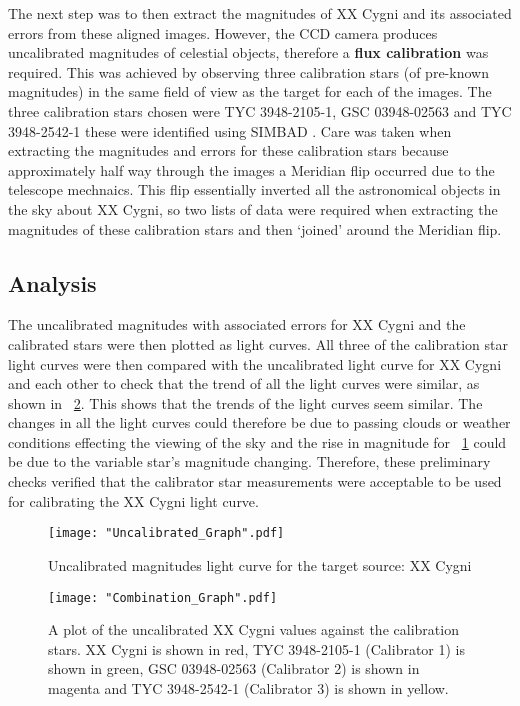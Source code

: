 \documentclass{article}
\newcommand{\figref}[2][\figurename~]{#1\ref{#2}}
\begin{document}
\vspace{2mm}
\noindent
The next step was to then extract the magnitudes of XX Cygni and its associated errors from these aligned images. However, the CCD camera produces uncalibrated magnitudes of celestial objects, therefore a \textbf{flux calibration} was required. This was achieved by observing three calibration stars (of pre-known magnitudes) in the same field of view as the target for each of the images. The three calibration stars chosen were TYC 3948-2105-1, GSC 03948-02563 and TYC 3948-2542-1 these were identified using SIMBAD \cite{Web02}. Care was taken when extracting the magnitudes and errors for these calibration stars because approximately half way through the images a Meridian flip occurred due to the telescope mechnaics. This flip essentially inverted all the astronomical objects in the sky about XX Cygni, so two lists of data were required when extracting the magnitudes of these calibration stars and then `joined' around the Meridian flip. 

\subsection{Analysis}
\label{ssec:analysis}

The uncalibrated magnitudes with associated errors for XX Cygni and the calibrated stars were then plotted as light curves. All three of the calibration star light curves were then compared with the uncalibrated light curve for XX Cygni and each other to check that the trend of all the light curves were similar, as shown in \figref{fig:combination-graph}. This shows that the trends of the light curves seem similar. The changes in all the light curves could therefore be due to passing clouds or weather conditions effecting the viewing of the sky and the rise in magnitude for \figref{fig:uncalibrated-graph} could be due to the variable star's magnitude changing. Therefore, these preliminary checks verified that the calibrator star measurements were acceptable to be used for calibrating the XX Cygni light curve.

\begin{figure}[h]
\centering
\texttt{[image: "Uncalibrated\_Graph".pdf]}
\caption{Uncalibrated magnitudes light curve for the target source: XX Cygni}
\label{fig:uncalibrated-graph}
\end{figure}

\begin{figure}[h]
\centering
\texttt{[image: "Combination\_Graph".pdf]}
\caption{A plot of the uncalibrated XX Cygni values against the calibration stars. XX Cygni is  shown in red, TYC 3948-2105-1 (Calibrator 1) is shown in green, GSC 03948-02563 (Calibrator 2) is shown in magenta and TYC 3948-2542-1 (Calibrator 3) is shown in yellow.}
\label{fig:combination-graph}
\end{figure}  
\end{document}

